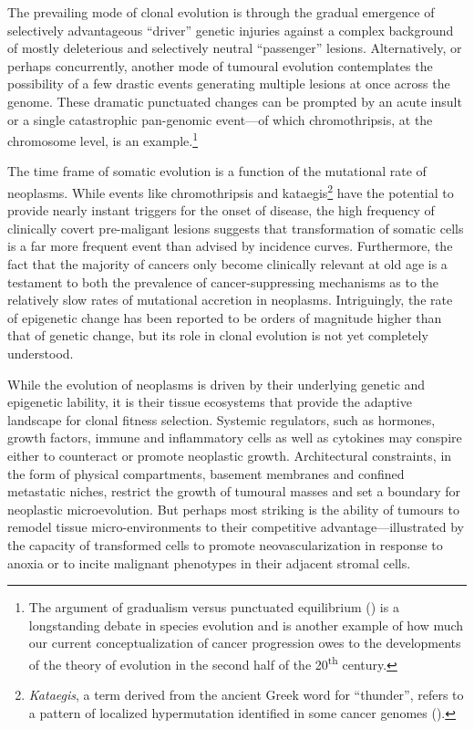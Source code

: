 The prevailing mode of clonal evolution is through the gradual emergence of
selectively advantageous ``driver'' genetic injuries against a complex
background of mostly deleterious and selectively neutral ``passenger'' lesions.
Alternatively, or perhaps concurrently, another mode of tumoural evolution
contemplates the possibility of a few drastic events generating multiple lesions
at once across the genome.  These dramatic punctuated changes can be prompted by
an acute insult or a single catastrophic pan-genomic event---of which
chromothripsis, at the chromosome level, is an
example.\cite{stephens_massive_2011}\footnote{The argument of gradualism versus
  punctuated equilibrium (\citealp{gould_punctuated_1993}) is a longstanding
  debate in species evolution and is another example of how much our current
  conceptualization of cancer progression owes to the developments of the theory
  of evolution in the second half of the 20\textsuperscript{th} century.}

The time frame of somatic evolution is a function of the mutational rate of
neoplasms.  While events like chromothripsis and
kataegis\footnote{\emph{Kataegis}, a term derived from the ancient Greek word
  for ``thunder'', refers to a pattern of localized hypermutation identified in
  some cancer genomes (\mbox{\citealp{nik-zainal_mutational_2012}}).} have the
potential to provide nearly instant triggers for the onset of disease, the high
frequency of clinically covert \mbox{pre-maligant}
lesions\cite{sakr_frequency_1993} suggests that transformation of somatic cells
is a far more frequent event than advised by incidence curves.  Furthermore, the
fact that the majority of cancers only become clinically relevant at old age is
a testament to both the prevalence of cancer-suppressing mechanisms as to the
relatively slow rates of mutational accretion in neoplasms.  Intriguingly, the
rate of epigenetic change has been reported to be orders of magnitude higher
than that of genetic change,\cite{siegmund_inferring_2009} but its role in
clonal evolution is not yet completely understood.


While the evolution of neoplasms is driven by their underlying genetic and
epigenetic lability, it is their tissue ecosystems that provide the adaptive
landscape for clonal fitness selection.\cite{greaves_clonal_2012} Systemic
regulators, such as hormones, growth factors, immune and inflammatory cells as
well as cytokines may conspire either to counteract or promote neoplastic
growth.\cite{bierie_tumour_2006,hanahan_hallmarks_2011} Architectural
constraints, in the form of physical compartments, basement membranes and
confined metastatic niches, restrict the growth of tumoural masses and set a
boundary for neoplastic microevolution.  But perhaps most striking is the
ability of tumours to remodel tissue micro-environments to their competitive
advantage---illustrated by the capacity of transformed cells to promote
neovascularization in response to anoxia or to incite malignant phenotypes in
their adjacent stromal cells.\cite{lathia_deadly_2011}

